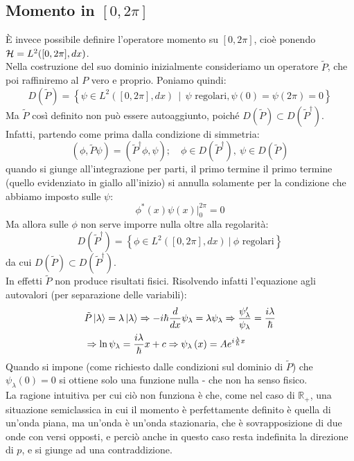 \documentclass[../../FisicaTeorica.tex]{subfiles}
\begin{document}
\subsection{Momento in $[0,2\pi]$}
\label{sec:momento_compatto}
È invece possibile definire l'operatore momento su $[0,2\pi]$, cioè ponendo $\mathcal{H} = L^2([0,2\pi],dx)$.\\
Nella costruzione del suo dominio inizialmente consideriamo un operatore  $\tilde{P}$, che poi raffiniremo al $P$ vero e proprio. Poniamo quindi:
\[
D\left(\widetilde{P}\right)= \left\{\psi\in L^2\left(\left[0,2\pi\right],dx\right)\ \ |\ \ \psi\text{ regolari},\psi\left(0\right)=\psi\left(2\pi\right)=0\right\}
\]
Ma $\widetilde{P}$ così definito non può essere autoaggiunto, poiché $D(\widetilde{P})\subset D({\widetilde{P}}^\dag)$. Infatti, partendo come prima dalla condizione di simmetria:
\[
\left(\phi,\tilde{P}\psi\right)=(\tilde{P}^\dag\phi,\psi);\quad \phi\in D(\tilde{P}^\dag), \> \psi \in D(\tilde{P})
\]
quando si giunge all'integrazione per parti, il primo termine il primo termine (quello evidenziato in giallo all'inizio) si annulla solamente per la condizione che abbiamo imposto sulle $\psi$:
\[
\phi^\ast\left(x\right)\psi\left(x\right)\big|_0^{2\pi}=0
\]
Ma allora sulle $\phi$ non serve imporre nulla oltre alla regolarità:
\[
D\left({\widetilde{P}}^\dag\right)=\left\{\phi\in L^2\left(\left[0,2\pi\right],dx\right)\ |\ \phi\text{ regolari}\right\}
\]
da cui $D(\tilde{P})\subset D(\tilde{P}^\dag)$.\\
In effetti $\tilde{P}$ non produce risultati fisici. Risolvendo infatti l'equazione agli autovalori (per separazione delle variabili):
\begin{align*}
    &\tilde{P}\ket{\lambda} = \lambda \ket{\lambda} \Rightarrow -i\hbar\frac{d}{dx}\psi_\lambda = \lambda\psi_\lambda \Rightarrow \frac{\psi_\lambda'}{\psi_\lambda} = \frac{i\lambda}{\hbar}\\
    &\Rightarrow \ln \psi_\lambda = \frac{i\lambda}{\hbar}x + c \Rightarrow \psi_\lambda\left(x\right)=A e^{i\frac{\lambda}{\hbar}x}
\end{align*}
Quando si impone (come richiesto dalle condizioni sul dominio di $\tilde{P}$) che $\psi_\lambda\left(0\right)=0$ si ottiene solo una funzione nulla - che non ha senso fisico.\\
La ragione intuitiva per cui ciò non funziona è che, come nel caso di $\mathbb{R}_+$, una situazione semiclassica in cui il momento è perfettamente definito è quella di un'onda piana, ma un'onda  è un'onda stazionaria, che è sovrapposizione di due onde con versi opposti, e perciò anche in questo caso resta indefinita la direzione di $p$, e si giunge ad una contraddizione.\\
\end{document}
